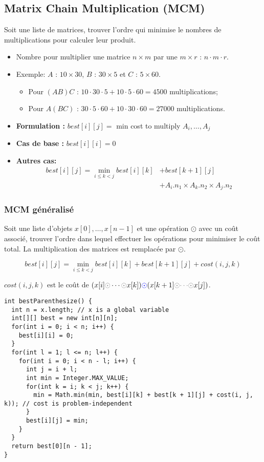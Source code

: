 \subsection{Matrix Chain Multiplication (MCM)}
Soit une liste de matrices, trouver l'ordre qui minimise le nombres de multiplications pour calculer leur produit.

\begin{itemize}
 \item Nombre pour multiplier une matrice $n \times m$ par une $m \times r$ : $n \cdot m \cdot r$.

 \item Exemple: $A$ : $10 \times 30$, $B$ : $30 \times 5$ et $C$ : $5 \times 60$.
 \begin{itemize}
 \item Pour $(AB)C$ : $10 \cdot 30 \cdot 5 + 10 \cdot 5 \cdot 60 = 4500$ multiplications;
 \item Pour $A(BC)$ : $30 \cdot 5 \cdot 60 + 10 \cdot 30 \cdot 60 = 27000$ multiplications.
  \end{itemize}
\end{itemize}

\begin{itemize}
 \item \textbf{Formulation :}
 $best[i][j] =$ min cost to multiply $A_i, \ldots, A_j$
 \item \textbf{Cas de base :} $best[i][i] = 0 $
 \item \textbf{Autres cas:}
 \begin{align*}
 best[i][j] = \min_{i \leq k < j} best[i][k] & + best[k + 1][j] \\
                                             & + A_i.n_1 \times A_k.n_2 \times A_j.n_2
 \end{align*}
\end{itemize}

\subsubsection{MCM généralisé}
Soit une liste d'objets $x[0], \ldots, x[n - 1]$ et une opération $\odot$ avec un coût associé, trouver l'ordre dans lequel effectuer les opérations pour minimiser le coût total. La multiplication des matrices est remplacée par $\odot$.

$$ best[i][j] = \min_{i \leq k < j} best[i][k] + best[k + 1][j] + cost(i, j, k)$$

$cost(i, j, k)$ est le coût de $(x[i] {\color{gray} \odot} \cdots {\color{gray} \odot} x[k]) {\color{blue} \mathbf{\odot}} (x[k + 1] {\color{gray} \odot} {\color{gray} \cdots} {\color{gray} \odot} x[j])$.
\newline
\begin{lstlisting}
int bestParenthesize() {
  int n = x.length; // x is a global variable
  int[][] best = new int[n][n];
  for(int i = 0; i < n; i++) { 
    best[i][i] = 0;
  }
  for(int l = 1; l <= n; l++) {
    for(int i = 0; i < n - l; i++) {
      int j = i + l;
      int min = Integer.MAX_VALUE;
      for(int k = i; k < j; k++) {
        min = Math.min(min, best[i][k] + best[k + 1][j] + cost(i, j, k)); // cost is problem-independent
      }
      best[i][j] = min;
    }
  }
  return best[0][n - 1];
} 
\end{lstlisting}